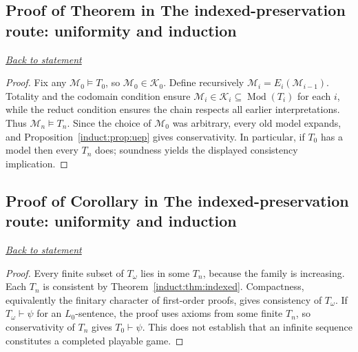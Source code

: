 \documentclass[11pt,letterpaper]{article}
\theoremstyle{definition}\newtheorem{definition}[theorem]{Definition}\newtheorem{example}[theorem]{Example}
\theoremstyle{remark}\newtheorem{remark}[theorem]{Remark}
\newcommand{\Mod}{\operatorname{Mod}}
\newcommand{\backlink}[1]{\noindent\hyperref[#1]{\textit{Back to statement}}\par\smallskip}
\begin{document}
\subsection{Proof of Theorem in The indexed-preservation route: uniformity and induction}\label{br:induct:proof:4}\backlink{br:induct:stmt:4}
\begin{proof}
Fix any \(\mathcal M_0\models T_0\), so \(\mathcal M_0\in\mathcal K_0\). Define recursively \(\mathcal M_i=E_i(\mathcal M_{i-1})\). Totality and the codomain condition ensure \(\mathcal M_i\in\mathcal K_i\subseteq\Mod(T_i)\) for each \(i\), while the reduct condition ensures the chain respects all earlier interpretations. Thus \(\mathcal M_n\models T_n\). Since the choice of \(\mathcal M_0\) was arbitrary, every old model expands, and Proposition~\ref{induct:prop:uep} gives conservativity. In particular, if \(T_0\) has a model then every \(T_n\) does; soundness yields the displayed consistency implication.
\end{proof}

\subsection{Proof of Corollary in The indexed-preservation route: uniformity and induction}\label{br:induct:proof:5}\backlink{br:induct:stmt:5}
\begin{proof}
Every finite subset of \(T_\omega\) lies in some \(T_n\), because the family is increasing. Each \(T_n\) is consistent by Theorem~\ref{induct:thm:indexed}. Compactness, equivalently the finitary character of first-order proofs, gives consistency of \(T_\omega\). If $T_\omega\vdash\psi$ for an $L_0$-sentence, the proof uses axioms from some finite $T_n$, so conservativity of $T_n$ gives $T_0\vdash\psi$. This does not establish that an infinite sequence constitutes a completed playable game.
\end{proof}
\end{document}
